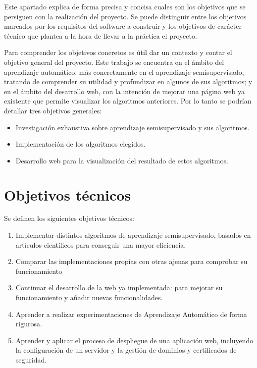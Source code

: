 
Este apartado explica de forma precisa y concisa cuales son los objetivos que se persiguen con la realización del proyecto. Se puede distinguir entre los objetivos marcados por los requisitos del software a construir y los objetivos de carácter técnico que plantea a la hora de llevar a la práctica el proyecto.

Para comprender los objetivos concretos es útil dar un contexto y contar el objetivo general del proyecto. Este trabajo se encuentra en el ámbito del aprendizaje automático, más concretamente en el aprendizaje semisupervisado, tratando de comprender su utilidad y profundizar en algunos de sus algoritmos; y en el ámbito del desarrollo web, con la intención de mejorar una página web ya existente que permite visualizar los algoritmos anteriores. Por lo tanto se podrían detallar tres objetivos generales:
\begin{itemize}
	\item Investigación exhaustiva sobre aprendizaje semisupervisado y sus algoritmos.
	\item Implementación de los algoritmos elegidos.
	\item Desarrollo web para la visualización del resultado de estos algoritmos.
\end{itemize}

\section{Objetivos técnicos}
Se definen los siguientes objetivos técnicos:

\begin{enumerate}
	\item Implementar distintos algoritmos de aprendizaje semisupervisado, basados en artículos científicos para conseguir una mayor eficiencia.
	\item Comparar las implementaciones propias con otras ajenas para comprobar su funcionamiento
	\item Continuar el desarrollo de la web ya implementada: para mejorar su funcionamiento y añadir nuevas funcionalidades.
	\item Aprender a realizar experimentaciones de Aprendizaje Automático de forma rigurosa.
	\item Aprender y aplicar el proceso de despliegue de una aplicación web, incluyendo la configuración de un servidor y la gestión de dominios y certificados de seguridad.
\end{enumerate}

